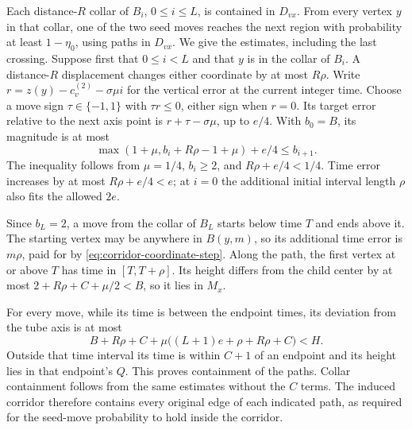\documentclass[11pt]{article}
\theoremstyle{definition}
\begin{document}
Each distance-$R$ collar of $B_i$, $0\le i\le L$, is contained in
$D_{vx}$. From every vertex $y$ in that collar, one of the two seed
moves reaches the next region with probability at least $1-\eta_0$,
using paths in $D_{vx}$. We give the estimates, including the last
crossing. Suppose first that $0\le i<L$ and that $y$ is in the
collar of $B_i$. A distance-$R$ displacement changes either coordinate
by at most $R\rho$. Write
$r=z(y)-c_v^{(2)}-\sigma\mu i$ for the vertical error at the current
integer time. Choose a move sign $\tau\in\{-1,1\}$ with $\tau r\le0$,
either sign when $r=0$. Its target error relative to the next axis
point is $r+\tau-\sigma\mu$, up to $e/4$. With $b_0=B$, its magnitude
is at most
\[
 \max(1+\mu,b_i+R\rho-1+\mu)+e/4\le b_{i+1}.
\]
The inequality follows from $\mu=1/4$, $b_i\ge2$, and
$R\rho+e/4<1/4$. Time error increases by at most $R\rho+e/4<e$;
at $i=0$ the additional initial interval length $\rho$ also fits
the allowed $2e$.

Since $b_L=2$, a move from the collar of $B_L$ starts below time $T$
and ends above it. The starting vertex may be anywhere in $B(y,m)$,
so its additional time error is $m\rho$, paid for by
\eqref{eq:corridor-coordinate-step}. Along the path, the first vertex
at or above $T$ has time in $[T,T+\rho]$. Its height differs from
the child center by at most $2+R\rho+C+\mu/2<B$, so it lies in $M_x$.

For every move, while its time is between the endpoint times, its
deviation from the tube axis is at most
\[
 B+R\rho+C+\mu\bigl((L+1)e+\rho+R\rho+C\bigr)<H.
\]
Outside that time interval its time is within $C+1$ of an endpoint
and its height lies in that endpoint's $Q$. This proves containment
of the paths. Collar containment follows from the same estimates
without the $C$ terms. The induced corridor therefore contains every
original edge of each indicated path, as required for the seed-move
probability to hold inside the corridor.
\end{document}

